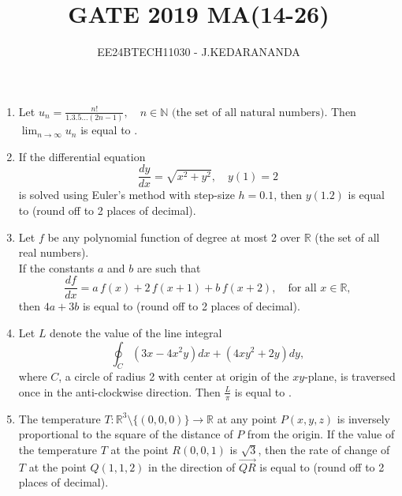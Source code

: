 \documentclass[journal]{IEEEtran}
\renewcommand{\thefigure}{\theenumi}
\renewcommand{\thetable}{\theenumi}
\numberwithin{equation}{enumi}
\numberwithin{figure}{enumi}
\renewcommand{\thetable}{\theenumi}
\begin{document}

\vspace{3cm}

\title{GATE 2019 MA(14-26)}
\author{EE24BTECH11030 - J.KEDARANANDA}
{\let\newpage\relax\maketitle}
\renewcommand{\thefigure}{\theenumi}
\renewcommand{\thetable}{\theenumi}
\begin{enumerate}
\item  Let
$
u_n = \frac{n!}{1.3.5\ldots (2n-1)}, \quad n \in \mathbb{N} \text{ (the set of all natural numbers)}.
$
Then $\lim_{n \to \infty} u_n$ is equal to \underline{\hspace{2cm}}.

\bigskip

\item  If the differential equation
\[
\frac{dy}{dx} = \sqrt{x^2 + y^2}, \quad y(1) = 2
\]
is solved using Euler's method with step-size $h = 0.1$, then $y(1.2)$ is equal to \underline{\hspace{2cm}} (round off to 2 places of decimal).

\bigskip

\item  Let $f$ be any polynomial function of degree at most 2 over $\mathbb{R}$ (the set of all real numbers).\\
If the constants $a$ and $b$ are such that
\[
\frac{df}{dx} = a \, f(x) + 2 \, f(x+1) + b \, f(x+2), \quad \text{for all } x \in \mathbb{R},
\]
then $4a + 3b$ is equal to \underline{\hspace{2cm}} (round off to 2 places of decimal).

\bigskip

\item  Let $L$ denote the value of the line integral
\[
\oint_C \left(3x - 4x^2y\right) dx + \left(4xy^2 + 2y\right) dy,
\]
where $C$, a circle of radius 2 with center at origin of the $xy$-plane, is traversed once in the anti-clockwise direction. Then $\frac{L}{\pi}$ is equal to \underline{\hspace{2cm}}.

\bigskip

\item  The temperature $T : \mathbb{R}^3 \setminus \{(0, 0, 0)\} \rightarrow \mathbb{R}$ at any point $P(x, y, z)$ is inversely proportional to the square of the distance of $P$ from the origin. If the value of the temperature $T$ at the point $R(0, 0, 1)$ is $\sqrt{3}$, then the rate of change of $T$ at the point $Q(1, 1, 2)$ in the direction of $\overrightarrow{QR}$ is equal to \underline{\hspace{2cm}} (round off to 2 places of decimal).


\end{enumerate}
\end{document}
